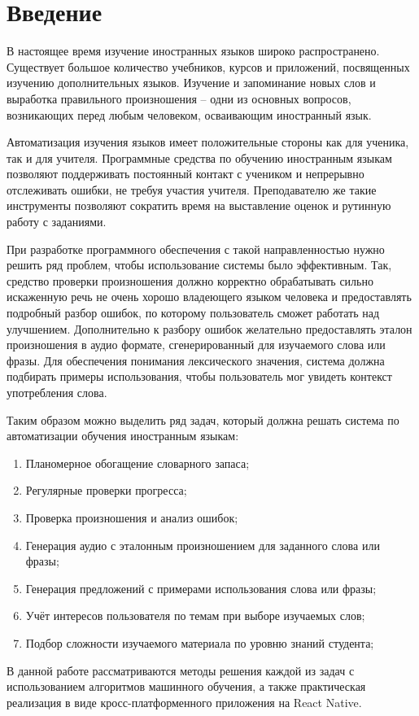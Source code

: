 \section*{Введение}
В настоящее время изучение иностранных языков широко распространено. Существует большое количество учебников, курсов и приложений, посвященных изучению дополнительных языков. Изучение и запоминание новых слов и выработка правильного произношения -- одни из основных вопросов, возникающих перед любым человеком, осваивающим иностранный язык.

Автоматизация изучения языков имеет положительные стороны как для ученика, так и для учителя. Программные средства по обучению иностранным языкам позволяют поддерживать постоянный контакт с учеником и непрерывно отслеживать ошибки, не требуя участия учителя. Преподавателю же такие инструменты позволяют сократить время на выставление оценок и рутинную работу с заданиями.

При разработке программного обеспечения с такой направленностью нужно решить ряд проблем, чтобы использование системы было эффективным. Так, средство проверки произношения должно корректно обрабатывать сильно искаженную речь не очень хорошо владеющего языком человека и предоставлять подробный разбор ошибок, по которому пользователь сможет работать над улучшением. Дополнительно к разбору ошибок желательно предоставлять эталон произношения в аудио формате, сгенерированный для изучаемого слова или фразы. Для обеспечения понимания лексического значения, система должна подбирать примеры использования, чтобы пользователь мог увидеть контекст употребления слова.

Таким образом можно выделить ряд задач, который должна решать система по автоматизации обучения иностранным языкам:
\begin{enumerate}
	\item Планомерное обогащение словарного запаса;
	\item Регулярные проверки прогресса;
	\item Проверка произношения и анализ ошибок;
	\item Генерация аудио с эталонным произношением для заданного слова или фразы;
	\item Генерация предложений с примерами использования слова или фразы;
	\item Учёт интересов пользователя по темам при выборе изучаемых слов;
	\item Подбор сложности изучаемого материала по уровню знаний студента;
\end{enumerate}
В данной работе рассматриваются методы решения каждой из задач с использованием алгоритмов машинного обучения, а также практическая реализация в виде кросс-платформенного приложения на React Native.

